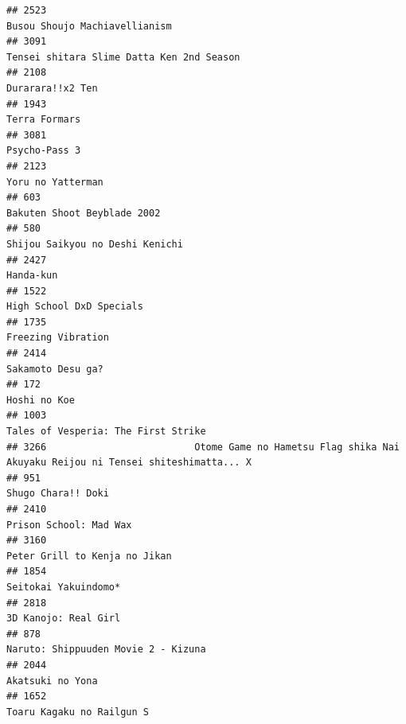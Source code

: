 \documentclass[
]{article}
\begin{document}
\begin{verbatim}
## 2523                                                                             Busou Shoujo Machiavellianism
## 3091                                                                 Tensei shitara Slime Datta Ken 2nd Season
## 2108                                                                                          Durarara!!x2 Ten
## 1943                                                                                             Terra Formars
## 3081                                                                                             Psycho-Pass 3
## 2123                                                                                         Yoru no Yatterman
## 603                                                                                Bakuten Shoot Beyblade 2002
## 580                                                                            Shijou Saikyou no Deshi Kenichi
## 2427                                                                                                 Handa-kun
## 1522                                                                                  High School DxD Specials
## 1735                                                                                        Freezing Vibration
## 2414                                                                                         Sakamoto Desu ga?
## 172                                                                                               Hoshi no Koe
## 1003                                                                       Tales of Vesperia: The First Strike
## 3266                          Otome Game no Hametsu Flag shika Nai Akuyaku Reijou ni Tensei shiteshimatta... X
## 951                                                                                         Shugo Chara!! Doki
## 2410                                                                                    Prison School: Mad Wax
## 3160                                                                             Peter Grill to Kenja no Jikan
## 1854                                                                                      Seitokai Yakuindomo*
## 2818                                                                                      3D Kanojo: Real Girl
## 878                                                                        Naruto: Shippuuden Movie 2 - Kizuna
## 2044                                                                                          Akatsuki no Yona
## 1652                                                                                 Toaru Kagaku no Railgun S

\end{verbatim}
\end{document}
